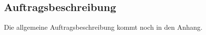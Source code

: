 \begin{appendix} %
\section{Auftragsbeschreibung}
%
Die allgemeine Auftragsbeschreibung kommt noch in den Anhang.


\end{appendix}